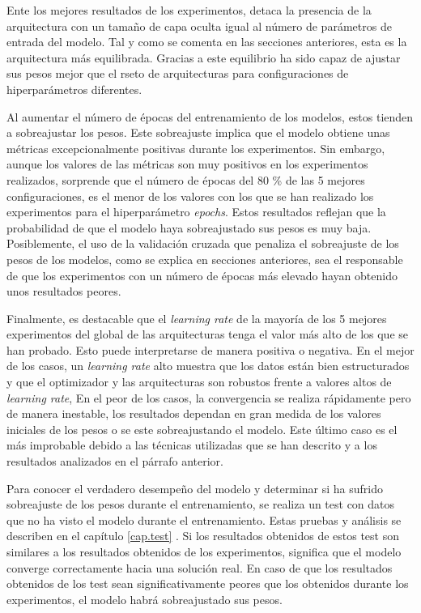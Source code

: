 Ente los mejores resultados de los experimentos, detaca la presencia de la arquitectura con un tamaño de capa oculta igual al número de parámetros de entrada del modelo. Tal y como se comenta en las secciones anteriores, esta es la arquitectura más equilibrada. Gracias a este equilibrio ha sido capaz de ajustar sus pesos mejor que el rseto de arquitecturas para configuraciones de hiperparámetros diferentes.

Al aumentar el número de épocas del entrenamiento de los modelos, estos tienden a sobreajustar los pesos. Este sobreajuste implica que el modelo obtiene unas métricas excepcionalmente positivas durante los experimentos. Sin embargo, aunque los valores de las métricas son muy positivos en los experimentos realizados, sorprende que el número de épocas del 80 \% de las 5 mejores configuraciones, es el menor de los valores con los que se han realizado los experimentos para el hiperparámetro \textit{epochs}. Estos resultados reflejan que la probabilidad de que el modelo haya sobreajustado sus pesos es muy baja. Posiblemente, el uso de la validación cruzada que penaliza el sobreajuste de los pesos de los modelos, como se explica en secciones anteriores, sea el responsable de que los experimentos con un número de épocas más elevado hayan obtenido unos resultados peores.

Finalmente, es destacable que el \textit{learning rate} de la mayoría de los 5 mejores experimentos del global de las arquitecturas tenga el valor más alto de los que se han probado. Esto puede interpretarse de manera positiva o negativa.
En el mejor de los casos, un \textit{learning rate} alto muestra que los datos están bien estructurados y que el optimizador y las arquitecturas son robustos frente a valores altos de \textit{learning rate},
En el peor de los casos, la convergencia se realiza rápidamente pero de manera inestable, los resultados dependan en gran medida de los valores iniciales de los pesos o se este sobreajustando el modelo. Este último caso es el más improbable debido a las técnicas utilizadas que se han descrito y a los resultados analizados en el párrafo anterior.

Para conocer el verdadero desempeño del modelo y determinar si ha sufrido sobreajuste de los pesos durante el entrenamiento, se realiza un test con datos que no ha visto el modelo durante el entrenamiento. Estas pruebas y análisis se describen en el capítulo \ref{cap.test} . Si los resultados obtenidos de estos test son similares a los resultados obtenidos de los experimentos, significa que el modelo converge correctamente hacia una solución real. En caso de que los resultados obtenidos de los test sean significativamente peores que los obtenidos durante los experimentos, el modelo habrá sobreajustado sus pesos. 

